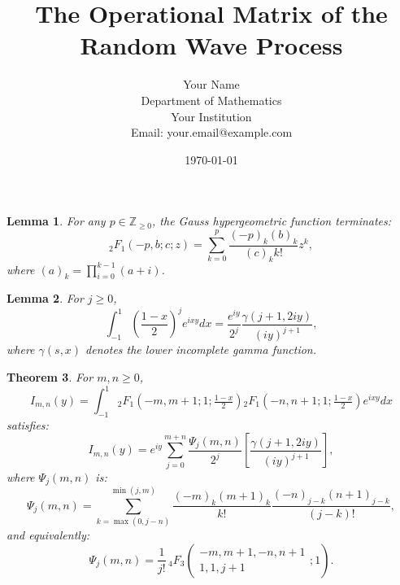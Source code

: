 \documentclass[12pt]{article}
\title{The Operational Matrix of the Random Wave Process}
\author{Your Name \\ Department of Mathematics \\ Your Institution \\ Email: your.email@example.com}
\date{\today}
\newtheorem{theorem}{Theorem}
\newtheorem{lemma}[theorem]{Lemma}
\begin{document}
\maketitle

\begin{lemma}\label{lem:HyperExpansions}
For any \( p \in \mathbb{Z}_{\geq 0} \), the Gauss hypergeometric function terminates:
\begin{equation}\label{eq:HyperSeries}
{}_2F_1(-p, b; c; z) = \sum_{k=0}^p \frac{(-p)_k (b)_k}{(c)_k k!} z^k,
\end{equation}
where \((a)_k = \prod_{i=0}^{k-1}(a+i)\).
\end{lemma}

\begin{lemma}\label{lem:IntegralGamma}
For \( j \geq 0 \), 
\begin{equation}\label{eq:IntegralGamma}
\int_{-1}^1 \left(\frac{1-x}{2}\right)^j e^{ixy}dx = \frac{e^{iy}}{2^j}\frac{\gamma(j+1,2iy)}{(iy)^{j+1}},
\end{equation}
where \(\gamma(s, x)\) denotes the lower incomplete gamma function.
\end{lemma}

\begin{theorem}\label{thm:MainResult}
For \( m,n \geq 0 \),
\[
I_{m,n}(y) = \int_{-1}^1 {}_2F_1\left(-m,m+1;1;\tfrac{1-x}{2}\right){}_2F_1\left(-n,n+1;1;\tfrac{1-x}{2}\right)e^{ixy}dx
\]
satisfies:
\[
I_{m,n}(y) = e^{iy}\sum_{j=0}^{m+n}\frac{\Psi_j(m,n)}{2^j}\left[\frac{\gamma(j+1,2iy)}{(iy)^{j+1}}\right],
\]
where \( \Psi_j(m,n) \) is:
\begin{equation}\label{eq:PsiSum}
\Psi_j(m,n) = \sum_{k=\max(0,j-n)}^{\min(j,m)} \frac{(-m)_k(m+1)_k}{k!}\frac{(-n)_{j-k}(n+1)_{j-k}}{(j-k)!},
\end{equation}
and equivalently:
\begin{equation}\label{eq:4F3}
\Psi_j(m,n) = \frac{1}{j!}\,{}_4F_3\left(\begin{array}{c} -m, m+1, -n, n+1 \\ 1, 1, j+1 \end{array};1\right).
\end{equation}
\end{theorem}
\end{document}

